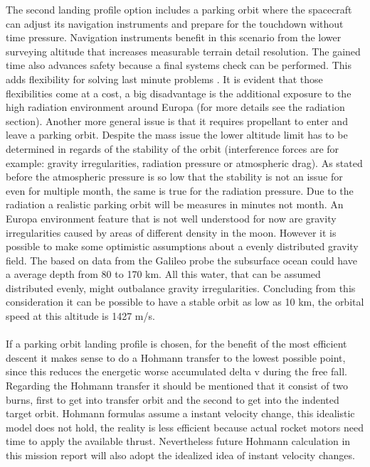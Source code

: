 The second landing profile option includes a parking orbit where the spacecraft can adjust its navigation instruments and prepare for the touchdown without time pressure. Navigation instruments benefit in this scenario from the lower surveying altitude that increases measurable terrain detail resolution. The gained time also advances safety because a final systems check can be performed. This adds flexibility for solving last minute problems . It is evident that those flexibilities come at a cost, a big disadvantage is the additional exposure to the high radiation environment around Europa (for more details see the radiation section). Another more general issue is that it requires propellant to enter and leave a parking orbit. Despite the mass issue the lower altitude limit has to be determined in regards of the stability of the orbit (interference forces are for example: gravity irregularities, radiation pressure or atmospheric drag). As stated before the atmospheric pressure is so low that the stability is not an issue for even for multiple month, the same is true for the radiation pressure. Due to the radiation a realistic parking orbit will be measures in minutes not month. An Europa environment feature that is not well understood for now are gravity irregularities caused by areas of different density in the moon. However it is possible to make some optimistic assumptions about a evenly distributed gravity field. The based on data from the Galileo probe the subsurface ocean could have a average depth from 80 to 170 km. All this water, that can be assumed distributed evenly, might outbalance gravity irregularities. Concluding from this consideration it can be possible to have a stable orbit as low as 10 km, the orbital speed at this altitude is 1427 m/s.\\
\\
If a parking orbit landing profile is chosen, for the benefit of the most efficient descent it makes sense to do a Hohmann transfer to the lowest possible point, since this reduces the energetic  worse accumulated delta v during the free fall. Regarding the Hohmann transfer it should be mentioned that it consist of two burns, first to get into transfer orbit and the second to get into the indented target orbit. Hohmann formulas assume a instant velocity change, this idealistic model does not hold, the reality is less efficient because actual rocket motors need time to apply the available thrust. Nevertheless future Hohmann calculation in this mission report will also adopt the idealized idea of instant velocity changes.\\
